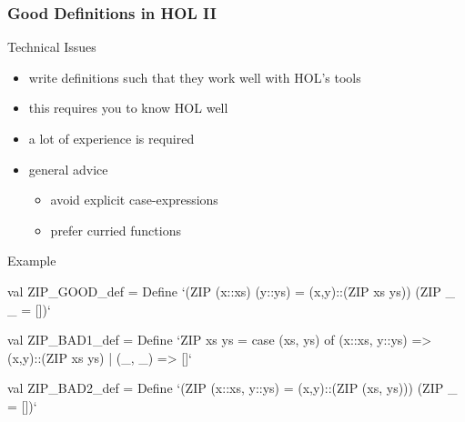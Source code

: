 \begin{frame}[fragile]
\frametitle{Good Definitions in HOL II}

\begin{block}{Technical Issues}
\begin{itemize}
\item write definitions such that they work well with HOL's tools
\item this requires you to know HOL well
\item a lot of experience is required
\item general advice
\begin{itemize}
\item avoid explicit case-expressions
\item prefer curried functions
\end{itemize}
\end{itemize}
\end{block}

\begin{block}{Example}
\begin{semiverbatim}\scriptsize
val ZIP_GOOD_def = Define `(ZIP (x::xs) (y::ys) = (x,y)::(ZIP xs ys)) \holAnd{}
                           (ZIP _ _ = [])`

val ZIP_BAD1_def = Define `ZIP xs ys = case (xs, ys) of 
                                         (x::xs, y::ys) => (x,y)::(ZIP xs ys)
                                       | (_, _) => []`

val ZIP_BAD2_def = Define `(ZIP (x::xs, y::ys) = (x,y)::(ZIP (xs, ys))) \holAnd{}
                           (ZIP _ = [])`
\end{semiverbatim}
\end{block}
\end{frame}



